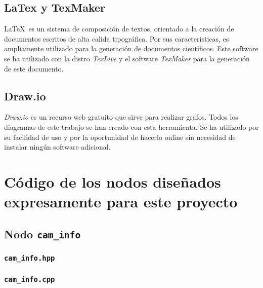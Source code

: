 \section{LaTex y TexMaker}

\LaTeX \, es un sistema de composición de textos, orientado a la creación de documentos escritos de alta calida tipográfica. Por sus características, es ampliamente utilizado para la generación de documentos científicos. Este software se ha utilizado con la distro \textit{TexLive} y el software \textit{TexMaker} para la generación de este documento.\\

\section{Draw.io}

\textit{Draw.io} es un recurso web gratuito que sirve para realizar grafos. Todos los diagramas de este trabajo se han creado con esta herramienta. Se ha utilizado por su facilidad de uso y por la oportunidad de hacerlo online sin necesidad de instalar ningún software adicional.\\

\chapter{Código de los nodos diseñados expresamente para este proyecto}

\section{Nodo \texttt{cam\_info}}

\subsection*{\texttt{cam\_info.hpp}}

\lstset{style=cppstyle}
\vspace{0.2cm}

\vspace{0.4cm}

\subsection*{\texttt{cam\_info.cpp}}

\vspace{0.2cm}

\vspace{0.4cm}

